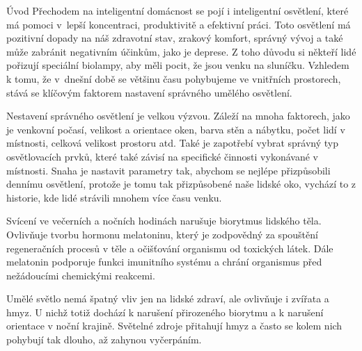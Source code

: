 \chap Úvod
Přechodem na inteligentní domácnost se pojí i inteligentní osvětlení, které má pomoci v~lepší koncentraci, produktivitě a efektivní práci. Toto osvětlení má pozitivní dopady
na náš zdravotní stav, zrakový komfort, správný vývoj a také může zabránit negativním
účinkům, jako je deprese. Z toho důvodu si někteří lidé pořizují speciální biolampy, aby
měli pocit, že jsou venku na sluníčku. Vzhledem k tomu, že v~dnešní době se většinu času
pohybujeme ve vnitřních prostorech, stává se klíčovým faktorem nastavení správného
umělého osvětlení.

\medskip
Nestavení správného osvětlení je velkou výzvou. Záleží na mnoha faktorech, jako je venkovní počasí, velikost a orientace oken, barva stěn a nábytku, počet lidí v místnosti, celková velikost prostoru atd. Také je zapotřebí vybrat správný typ osvětlovacích prvků, které také závisí na specifické činnosti vykonávané v místnosti. Snaha je nastavit parametry tak, abychom se nejlépe přizpůsobili dennímu osvětlení, protože je tomu tak přizpůsobené naše lidské oko, vychází to z historie, kde lidé strávili mnohem více času venku.

\medskip
Svícení ve večerních a nočních hodinách narušuje biorytmus lidského těla. Ovlivňuje tvorbu hormonu melatoninu, který je zodpovědný za spouštění regeneračních procesů v těle a očišťování organismu od toxických látek. Dále melatonin podporuje funkci imunitního systému a chrání organismus před nežádoucími chemickými reakcemi.

\medskip
Umělé světlo nemá špatný vliv jen na lidské zdraví, ale ovlivňuje i zvířata a hmyz. U nichž totiž dochází k narušení přirozeného biorytmu a k narušení orientace v noční krajině. Světelné zdroje přitahují hmyz a často se kolem nich pohybují tak dlouho, až zahynou vyčerpáním.


